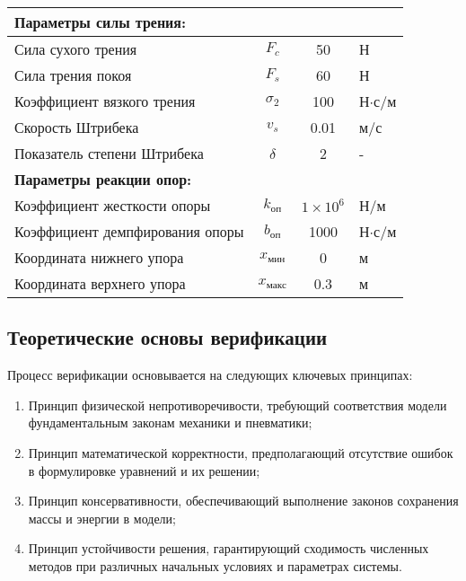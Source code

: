 \begin{table}[h]
\begin{tabular}{lccl}
        \midrule
        \multicolumn{4}{l}{\textbf{Параметры силы трения:}}                                                                         \\
        \midrule
        Сила сухого трения               & $F_c$                                     & 50                    & Н                    \\
        Сила трения покоя                & $F_s$                                     & 60                    & Н                    \\
        Коэффициент вязкого трения       & $\sigma_2$                                & 100                   & Н$\cdot$с/м          \\
        Скорость Штрибека                & $v_s$                                     & 0.01                  & м/с                  \\
        Показатель степени Штрибека      & $\delta$                                  & 2                     & -                    \\
        \midrule
        \multicolumn{4}{l}{\textbf{Параметры реакции опор:}}                                                                        \\
        \midrule
        Коэффициент жесткости опоры      & $k_\text{оп}$                             & $1 \times 10^6$       & Н/м                  \\
        Коэффициент демпфирования опоры  & $b_\text{оп}$                             & 1000                  & Н$\cdot$с/м          \\
        Координата нижнего упора         & $x_\text{мин}$                            & 0                     & м                    \\
        Координата верхнего упора        & $x_\text{макс}$                           & 0.3                   & м                    \\
        \midrule
    \end{tabular}
    \label{tab:ch2/extended_parameters}
\end{table}

\subsection{Теоретические основы верификации}\label{sec:ch2/sec6/subsec1}
Процесс верификации основывается на следующих ключевых принципах:

\begin{enumerate}
    \item Принцип физической непротиворечивости, требующий соответствия модели фундаментальным законам механики и пневматики;
    \item Принцип математической корректности, предполагающий отсутствие ошибок в формулировке уравнений и их решении;
    \item Принцип консервативности, обеспечивающий выполнение законов сохранения массы и энергии в модели;
    \item Принцип устойчивости решения, гарантирующий сходимость численных методов при различных начальных условиях и параметрах системы.
\end{enumerate}

